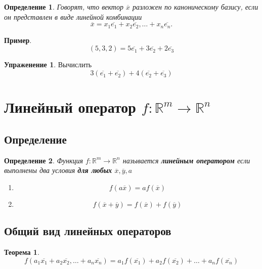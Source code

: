 \documentclass[]{article}
\theoremstyle{theorem}
\newtheorem{thr}{Теорема}
\newtheorem{dfn}{Определение}
\theoremstyle{definition}
\newtheorem{tk}{Упраженение}
\begin{document}
	\begin{dfn}
		Говорят, что вектор $\overline{x}$ разложен по каноническому базису, если он представлен в виде линейной комбинации
		$$\overline{x}=x_1\overline{e_1}+ x_2\overline{e_2},\ldots+ x_n\overline{e_n}.$$
	\end{dfn}
	\textbf{Пример}.
	\begin{equation*}
		(5,3,2) = 5\overline{e_1}+3\overline{e_2}+2\overline{e_3}
	\end{equation*} 
	
	\begin{tk}
		Вычислить
		\begin{equation*}
			3(\overline{e_1}+\overline{e_2})+4(\overline{e_2}+\overline{e_3})
		\end{equation*}
	\end{tk}
	
	\section{Линейный оператор $f:\mathbb{R}^m\rightarrow\mathbb{R}^n$}
	\subsection{Определение}
	\begin{dfn}
		Функция $f:\mathbb{R}^m\rightarrow\mathbb{R}^n$ называется \textbf{линейным оператором} если выполнены два условия \textbf{для любых} $\overline{x}, \overline{y}, a$
		\begin{enumerate}
			\item $$f(a\overline{x})=af(\overline{x})$$
			\item $$f(\overline{x}+\overline{y})=f(\overline{x})+f(\overline{y})$$
		\end{enumerate}
	\end{dfn}
	
	\subsection{Общий вид линейных операторов}
	\begin{thr}\label{th2}
		\begin{equation}
			f(a_1\overline{x_1}+ a_2\overline{x_2},\ldots+ a_n\overline{x_n})
			=
			a_1f(\overline{x_1})+ a_2f(\overline{x_2})+\ldots+ a_nf(\overline{x_n})
		\end{equation}
	\end{thr}
\end{document}
